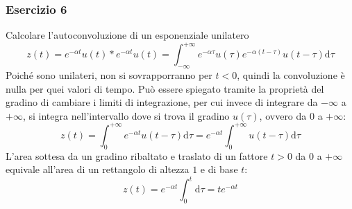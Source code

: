 \documentclass{article}
\newcommand{\df}{\mathrm{d}}
\begin{document}
\begin{center}
\end{center}

\subsubsection*{Esercizio 6}

Calcolare l'autoconvoluzione di un esponenziale unilatero
\begin{equation*}
    z(t)=e^{-\alpha t}u(t)*e^{-\alpha t}u(t)=\displaystyle\int_{-\infty}^{+\infty}e^{-\alpha\tau}u(\tau)e^{-\alpha(t-\tau)}u(t-\tau)\df\tau
\end{equation*}
Poiché sono unilateri, non si sovrapporranno per $t<0$, quindi la convoluzione è nulla per quei valori di tempo. Può essere spiegato tramite la proprietà del gradino di 
cambiare i limiti di integrazione, per cui invece di integrare da $-\infty$ a $+\infty$, si integra nell'intervallo dove si trova il gradino $u(\tau)$, ovvero da $0$ a $+\infty$: 
\begin{equation*}
    z(t)=\displaystyle\int_0^{+\infty}e^{-\alpha t}u(t-\tau)\df\tau=e^{-\alpha t}\int_0^{+\infty}u(t-\tau)\df\tau
\end{equation*}
L'area sottesa da un gradino ribaltato e traslato di un fattore $t>0$ da $0$ a $+\infty$ equivale all'area di un rettangolo di altezza $1$ e di base $t$:
\begin{equation*}
    z(t)=e^{-\alpha t}\displaystyle\int_0^t\df\tau=te^{-\alpha t}
\end{equation*}
\end{document}
